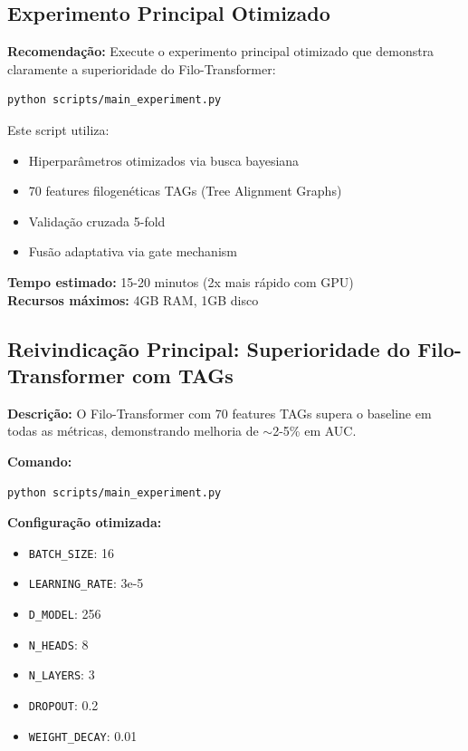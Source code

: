 \documentclass[12pt]{article}
\begin{document}
\subsection{Experimento Principal Otimizado}

\textbf{Recomenda\c{c}\~ao:} Execute o experimento principal otimizado que demonstra claramente a superioridade do Filo-Transformer:

\begin{verbatim}
python scripts/main_experiment.py
\end{verbatim}

Este script utiliza:
\begin{itemize}
    \item Hiperpar\^ametros otimizados via busca bayesiana
    \item 70 features filogen\'eticas TAGs (Tree Alignment Graphs)
    \item Valida\c{c}\~ao cruzada 5-fold
    \item Fus\~ao adaptativa via gate mechanism
\end{itemize}

\textbf{Tempo estimado:} 15-20 minutos (2x mais r\'apido com GPU)\\
\textbf{Recursos m\'aximos:} 4GB RAM, 1GB disco

\subsection{Reivindica\c{c}\~ao Principal: Superioridade do Filo-Transformer com TAGs}

\textbf{Descri\c{c}\~ao:} O Filo-Transformer com 70 features TAGs supera o baseline em todas as m\'etricas, demonstrando melhoria de $\sim$2-5\% em AUC.

\textbf{Comando:}
\begin{verbatim}
python scripts/main_experiment.py
\end{verbatim}

\textbf{Configura\c{c}\~ao otimizada:}
\begin{itemize}
    \item \texttt{BATCH\_SIZE}: 16
    \item \texttt{LEARNING\_RATE}: 3e-5
    \item \texttt{D\_MODEL}: 256
    \item \texttt{N\_HEADS}: 8
    \item \texttt{N\_LAYERS}: 3
    \item \texttt{DROPOUT}: 0.2
    \item \texttt{WEIGHT\_DECAY}: 0.01
\end{itemize}
\end{document}
